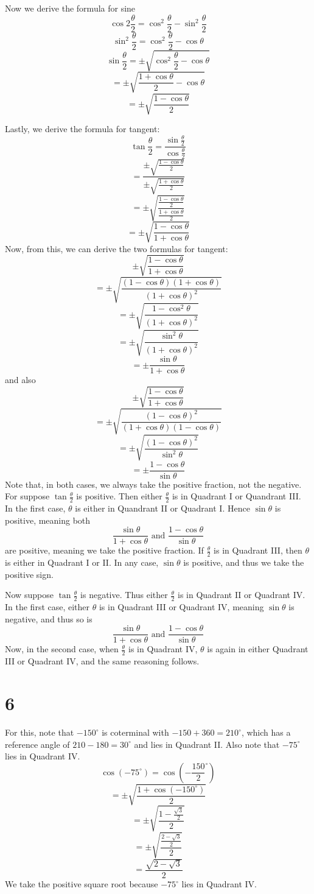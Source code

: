 \documentclass{article}
\theoremstyle{definition}
\newcommand{\?}{\stackrel{?}{=}}
\begin{document}
Now we derive the formula for sine
\[ \cos 2\frac{\theta}{2}=\cos^2\frac{\theta}{2}-\sin^2\frac{\theta}{2} \]
\[ \sin^2\frac{\theta}{2}=\cos^2\frac{\theta}{2}-\cos\theta \]
\[ \sin\frac{\theta}{2}=\pm\sqrt{\cos^2\frac{\theta}{2}-\cos\theta} \]
\[ =\pm\sqrt{\frac{1+\cos\theta}{2}-\cos\theta} \]
\[ =\pm\sqrt{\frac{1-\cos\theta}{2}} \]



Lastly, we derive the formula for tangent:
\[ \tan\frac{\theta}{2}=\dfrac{\sin\frac{\theta}{2}}{\cos\frac{\theta}{2}} \]
\[ =\dfrac{\pm\sqrt{\frac{1-\cos\theta}{2}}}{\pm\sqrt{\frac{1+\cos\theta}{2}}} \]
\[ =\pm\sqrt{\dfrac{\frac{1-\cos\theta}{2}}{\frac{1+\cos\theta}{2}}} \]
\[ =\pm\sqrt{\frac{1-\cos\theta}{1+\cos\theta}} \]
Now, from this, we can derive the two formulas for tangent:
\[ \pm\sqrt{\frac{1-\cos\theta}{1+\cos\theta}} \]
\[ =\pm\sqrt{\frac{(1-\cos\theta)(1+\cos\theta)}{(1+\cos\theta)^2}} \]
\[ =\pm\sqrt{\frac{1-\cos^2\theta}{(1+\cos\theta)^2}} \]
\[ =\pm\sqrt{\frac{\sin^2\theta}{(1+\cos\theta)^2}} \]
\[ =\pm\frac{\sin\theta}{1+\cos\theta} \]
and also
\[ \pm\sqrt{\frac{1-\cos\theta}{1+\cos\theta}} \]
\[ =\pm\sqrt{\frac{(1-\cos\theta)^2}{(1+\cos\theta)(1-\cos\theta)}} \]
\[ =\pm\sqrt{\frac{(1-\cos\theta)^2}{\sin^2\theta}} \]
\[ =\pm\frac{1-\cos\theta}{\sin\theta} \]
Note that, in both cases, we always take the positive fraction, not the negative. For suppose $\tan\frac{\theta}{2}$ is positive. Then either $\frac{\theta}{2}$ is in Quadrant I or 
Quandrant III. In the first case, $\theta$ is either in Quandrant II or Quadrant I. Hence $\sin\theta$ is positive, meaning both
\[ \frac{\sin\theta}{1+\cos\theta}\textrm{ and }\frac{1-\cos\theta}{\sin\theta} \] are positive, meaning we take the positive fraction. If $\frac{\theta}{2}$ is in Quadrant III, then 
$\theta$ is either in Quadrant I or II. In any case, $\sin\theta$ is positive, and thus we take the positive sign.


Now suppose $\tan\frac{\theta}{2}$ is negative. Thus either $\frac{\theta}{2}$ is in Quadrant II or Quadrant IV. In the first case, either $\theta$ is in Quadrant III or Quadrant IV, meaning 
$\sin\theta$ is negative, and thus so is
\[ \frac{\sin\theta}{1+\cos\theta}\textrm{ and }\frac{1-\cos\theta}{\sin\theta} \] Now, in the second case, when $\frac{\theta}{2}$ is in Quadrant IV, $\theta$ is again in either Quadrant III or 
Quadrant IV, and the same reasoning follows. 

\section*{6}
For this, note that $-150^\circ$ is coterminal with $-150+360=210^\circ$, which has a reference angle of $210-180=30^\circ$ and lies in Quadrant II. Also note that 
$-75^\circ$ lies in Quadrant IV.
\[ \cos(-75^\circ)=\cos(-\frac{150}{2}^\circ) \]
\[ =\pm\sqrt{\frac{1+\cos(-150^\circ)}{2}} \]
\[ =\pm\sqrt{\frac{1-\frac{\sqrt{3}}{2}}{2}} \]
\[ =\pm\sqrt{\frac{\frac{2-\sqrt{3}}{2}}{2}} \]
\[ =\frac{\sqrt{2-\sqrt{3}}}{2} \]
We take the positive square root because $-75^\circ$ lies in Quadrant IV.
\end{document}
